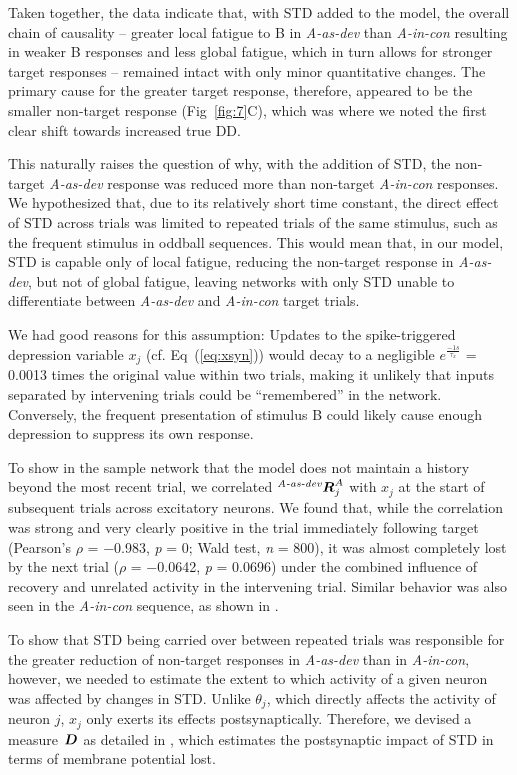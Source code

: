 \documentclass[10pt,letterpaper]{article}
\newcommand{\dev}{\textit{A-as-dev}}
\newcommand{\msc}{\textit{A-in-con}}
\newcommand{\std}{\textit{A-as-std}}
\newcommand{\ifstringequal}[4]{%
  \ifnum\pdfstrcmp{#1}{#2}=0
  #3%
  \else
  #4%
  \fi
}
\newcommand{\seqreplace}[1]{\ifstringequal{dev}{#1}{\dev}{%
    \ifstringequal{std}{#1}{\std}{%
        \ifstringequal{msc}{#1}{\msc}{#1}%
    }%
}}
\newcommand{\R}[3][]{{}^{\seqreplace{#1}}_{}\boldsymbol R^{#2}_{#3}}
\newcommand{\D}[3][]{{}^{\seqreplace{#1}}_{}\boldsymbol D^{#2}_{#3}}
\newcommand{\FIG}[1]{Fig~\ref{fig:#1}}
\newcommand{\EQ}[1]{Eq~(\ref{eq:#1})}
\newcommand{\statistic}[2]{\textit{#1} = \num{#2}}
\begin{document}
Taken together, the data indicate that, with STD added to the model, the overall chain of causality -- greater local fatigue to B in \dev{} than \msc{} resulting in weaker B responses and less global fatigue, which in turn allows for stronger target responses -- remained intact with only minor quantitative changes. The primary cause for the greater target response, therefore, appeared to be the smaller non-target response (\FIG{7}C), which was where we noted the first clear shift towards increased true DD.

This naturally raises the question of why, with the addition of STD, the non-target \dev{} response was reduced more than non-target \msc{} responses. We hypothesized that, due to its relatively short time constant, the direct effect of STD across trials was limited to repeated trials of the same stimulus, such as the frequent stimulus in oddball sequences. This would mean that, in our model, STD is capable only of local fatigue, reducing the non-target response in \dev{}, but not of global fatigue, leaving networks with only STD unable to differentiate between \dev{} and \msc{} target trials.

We had good reasons for this assumption: Updates to the spike-triggered depression variable $x_j$ (cf. \EQ{xsyn}) would decay to a negligible $e^\frac{-1 s}{\tau_x}$ = \num{0.0013} times the original value within two trials, making it unlikely that inputs separated by intervening trials could be ``remembered'' in the network. Conversely, the frequent presentation of stimulus B could likely cause enough depression to suppress its own response.

To show in the sample network that the model does not maintain a history beyond the most recent trial, we correlated $\R[dev]{A}{j}$ with $x_j$ at the start of subsequent trials across excitatory neurons. We found that, while the correlation was strong and very clearly positive in the trial immediately following target (Pearson's $\rho$ = \num{-0.983}, \statistic{p}{0}; Wald test, \statistic{n}{800}), it was almost completely lost by the next trial ($\rho$ = \num{-0.0642}, \statistic{p}{0.0696}) under the combined influence of recovery and unrelated activity in the intervening trial. Similar behavior was also seen in the \msc{} sequence, as shown in .

To show that STD being carried over between repeated trials was responsible for the greater reduction of non-target responses in \dev{} than in \msc{}, however, we needed to estimate the extent to which activity of a given neuron was affected by changes in STD. Unlike $\theta_j$, which directly affects the activity of neuron $j$, $x_j$ only exerts its effects postsynaptically. Therefore, we devised a measure $\D{}{}$ as detailed in , which estimates the postsynaptic impact of STD in terms of membrane potential lost.
\end{document}
